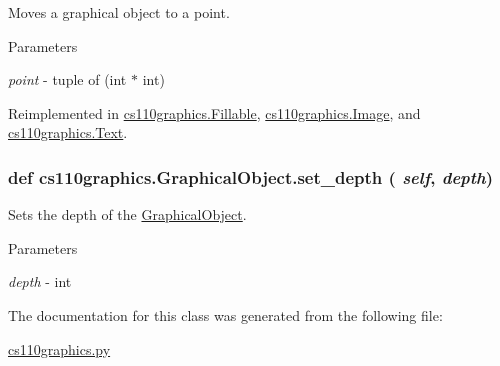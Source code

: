 Moves a graphical object to a point. 
\begin{DoxyParams}{Parameters}
\item[{\em point}]-\/ tuple of (int $\ast$ int) \end{DoxyParams}


Reimplemented in \hyperlink{classcs110graphics_1_1Fillable_adcabc14e76d1160ff591b9ef7f3d6a97}{cs110graphics.Fillable}, \hyperlink{classcs110graphics_1_1Image_a4b2e775fbb0cb523f6bc09028dc05c65}{cs110graphics.Image}, and \hyperlink{classcs110graphics_1_1Text_a615a76c8d2edd6c6af5d39d4e2577a27}{cs110graphics.Text}.\hypertarget{classcs110graphics_1_1GraphicalObject_a20d76d4ee4419c3065d61deb6cbc6700}{
\subsubsection[{set\_\-depth}]{\setlength{\rightskip}{0pt plus 5cm}def cs110graphics.GraphicalObject.set\_\-depth ( {\em self}, \/   {\em depth})}}
\label{classcs110graphics_1_1GraphicalObject_a20d76d4ee4419c3065d61deb6cbc6700}


Sets the depth of the \hyperlink{classcs110graphics_1_1GraphicalObject}{GraphicalObject}. 
\begin{DoxyParams}{Parameters}
\item[{\em depth}]-\/ int \end{DoxyParams}


The documentation for this class was generated from the following file:\begin{DoxyCompactItemize}
\item 
\hyperlink{cs110graphics_8py}{cs110graphics.py}\end{DoxyCompactItemize}
